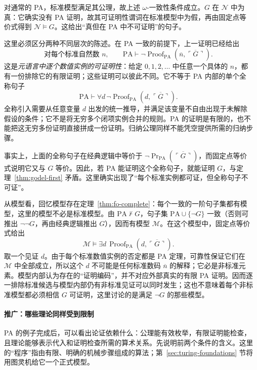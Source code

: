 \documentclass[lang=cn,a4paper,fontset=none,zihao=false,10pt,openany,twoside]{beautybook}
\numberwithin{algorithm}{chapter}
\begin{document}
\begin{remark}[真、可证明与非标准模型]
对通常的 PA，标准模型满足其公理，故上述 $\omega$-一致性条件成立。$G$ 在 $\mathcal N$ 中为真：它确实没有 PA 证明，故其可证明性谓词在标准模型中为假，再由固定点等价式得到 $\mathcal N\models G$。这给出“真但在 PA 中不可证明”的句子。

这里必须区分两种不同层次的陈述。在 PA 一致的前提下，上一证明已经给出
\[
 \text{对每个标准自然数 }n,\qquad
 \mathrm{PA}\vdash\neg\operatorname{Proof}_{\mathrm{PA}}
 (\overline n,\overline{\ulcorner G\urcorner}).
\]
这是\emph{元语言中逐个数值实例的可证明性}：给定 $0,1,2,\ldots$ 中任意一个具体的 $n$，都有一份排除它的有限证明；这些证明可以彼此不同。它不等于 PA 内部的单个全称句子
\[
 \mathrm{PA}\vdash\forall d\,
 \neg\operatorname{Proof}_{\mathrm{PA}}(d,\overline{\ulcorner G\urcorner}).
\]
全称引入需要从任意变量 $d$ 出发的统一推导，并满足该变量不自由出现于未解除假设的条件；它不是将无穷多个闭项实例合并的规则。PA 的证明是有限的，也不能把这无穷多份证明直接拼成一份证明。归纳公理同样不能凭空提供所需的归纳步骤。

事实上，上面的全称句子在经典逻辑中等价于
$\neg\operatorname{Pr}_{\mathrm{PA}}(\overline{\ulcorner G\urcorner})$，而固定点等价式说明它又与 $G$ 等价。因此，若 PA 能证明这个全称句子，就能证明 $G$，与定理~\ref{thm:godel-first} 矛盾。这里确实出现了“每个标准实例都可证，但全称句子不可证”。

从模型看，回忆模型存在定理~\ref{thm:fo-complete}：每个一致的一阶句子集都有模型，这里的模型不必是标准模型。由 $\mathrm{PA}\nvdash G$，句子集 $\mathrm{PA}\cup\{\neg G\}$ 一致（否则可推出 $\neg\neg G$，再由经典逻辑推出 $G$），因而有模型 $\mathcal M$。在这个模型中，固定点等价式给出
\[
 \mathcal M\models\exists d\,
 \operatorname{Proof}_{\mathrm{PA}}(d,\overline{\ulcorner G\urcorner}).
\]
取一个见证 $d$。由于每个标准数值实例的否定都是 PA 定理，可靠性保证它们在 $\mathcal M$ 中全部成立，所以这个 $d$ 不可能是任何标准数码 $\overline n$ 的解释；它必是非标准元素。模型内部认为存在的“证明编码”，并不对应外部真实的有限 PA 证明。因而逐一排除标准候选与模型内部仍有非标准见证可以同时发生；这也不意味着每个非标准模型都必须相信 $G$ 可证明，这里讨论的是满足 $\neg G$ 的那些模型。
\end{remark}



\paragraph{推广：哪些理论同样受到限制}
PA 的例子完成后，可以看出论证依赖什么：公理能有效枚举，有限证明能检查，且理论能够表示代入和证明检查所需的算术关系。先说明前两个条件的含义。这里的“程序”指由有限、明确的机械步骤组成的算法；第~\ref{sec:turing-foundations} 节将用图灵机给它一个正式模型。
\end{document}
